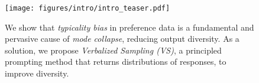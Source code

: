 \begin{figure}[h!]
    \centering
    \texttt{[image: figures/intro/intro\_teaser.pdf]}
    \caption{
    We show that \textit{typicality bias} in preference data is a fundamental and pervasive cause of \emph{mode collapse}, reducing output diversity. As a solution, we propose \textit{Verbalized Sampling (VS)}, a principled prompting method that returns distributions of responses, to improve diversity. 
    \vspace{-1em}
    }
    \label{fig:intro_teaser}
\end{figure}

